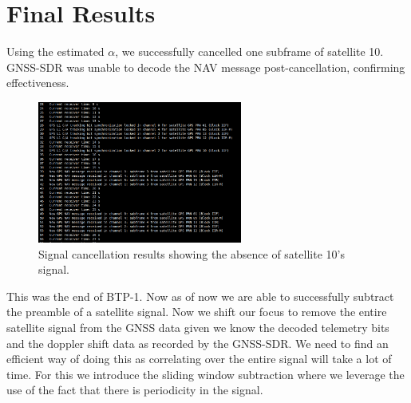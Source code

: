 \documentclass[12pt]{report}
\begin{document}
\section{Final Results}
Using the estimated $\alpha$, we successfully cancelled one subframe of satellite 10. GNSS-SDR was unable to decode the NAV message post-cancellation, confirming effectiveness.
\begin{figure}[H]
    \centering
    \includegraphics[width=0.6\textwidth]{cancellation.png}
    \caption{Signal cancellation results showing the absence of satellite 10's signal.}
    \label{fig:cancellation}
\end{figure}

\noindent This was the end of BTP-1. Now as of now we are able to successfully subtract the preamble of a satellite signal. Now we shift our focus to remove the entire satellite signal from the GNSS data
given we know the decoded telemetry bits and the doppler shift data as recorded by the GNSS-SDR. We need to find an efficient way of doing this as correlating over the entire signal will take a lot of time. For this we introduce
the sliding window subtraction where we leverage the use of the fact that there is periodicity in the signal.
\end{document}
